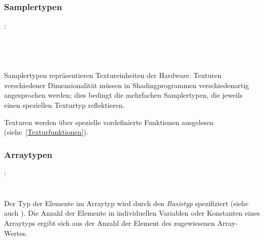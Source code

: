 
\subsubsection{Samplertypen}\label{Samplertypen}
:\label{typ_sampler}\\
\hspace*{1cm}\\
\hspace*{1cm}\\
\hspace*{1cm}\\
\hspace*{1cm}\\

Samplertypen repräsentieren Textureinheiten der Hardware. Texturen verschiedener
Dimensionalität müssen in Shadingprogrammen verschiedenartig angesprochen werden;
dies bedingt die mehrfachen Samplertypen, die jeweils einen speziellen Texturtyp
reflektieren.

Texturen werden über spezielle vordefinierte Funktionen ausgelesen (siehe~\ref{Texturfunktionen}).


\subsubsection{Arraytypen}\label{Arraytypen}
:\label{typ_array}\\
\hspace*{1cm}\Gt{[}\Gspace\Gt{]}\\
\hspace*{1cm}\Gt{[}\Gspace\Gt{]}\Gspace{} \\

Der Typ der Elemente im Arraytyp wird durch den \emph{Basistyp} spezifiziert (siehe auch ).
Die Anzahl der Elemente in individuellen Variablen oder Konstanten eines Arraytyps
ergibt sich aus der Anzahl der Element des zugewiesenen Array-Wertes.

